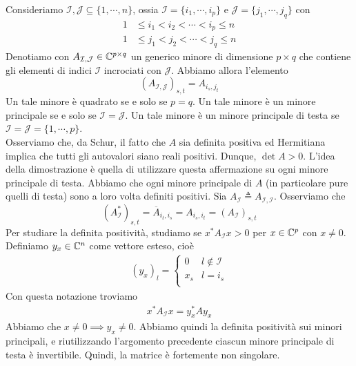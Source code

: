 \documentclass[a4paper]{article}
\begin{document}
\begin{snippetproof}{}
    Consideriamo \(\mathcal I, \mathcal J \subseteq \{1, \cdots, n\}\),
    ossia \(\mathcal I = \{i_1, \cdots, i_p\}\)
    e \(\mathcal J = \{j_1, \cdots, j_q\}\)
    con
    \begin{align*}
        1 &\leq i_1 < i_2 < \cdots < i_p \leq n \\
        1 &\leq j_1 < j_2 < \cdots < j_q \leq n
    \end{align*}
    Denotiamo con \(A_{\mathcal I, \mathcal J} \in \mathbb{C}^{p \times q}\)
    un generico minore di dimensione \(p \times q\) che contiene gli elementi di indici \(\mathcal I\) incrociati con \(\mathcal J\).
    Abbiamo allora l'elemento
    \[
        \left(A_{\mathcal I, \mathcal J}\right)_{s,t}
        = A_{i_s, j_t}
    \]
    Un tale minore è quadrato se e solo se \(p=q\).
    Un tale minore è un minore principale se e solo se \(\mathcal I = \mathcal J\).
    Un tale minore è un minore principale di testa se \(\mathcal I = \mathcal J = \{1, \cdots, p\}\). \\
    Osserviamo che, da Schur, il fatto che \(A\) sia definita positiva ed Hermitiana
    implica che tutti gli autovalori siano reali positivi.
    Dunque, \(\det A > 0\).
    L'idea della dimostrazione è quella di utilizzare questa affermazione su ogni minore principale di testa.
    Abbiamo che ogni minore principale di \(A\) (in particolare pure quelli di testa)
    sono a loro volta definiti positivi. Sia \(A_{\mathcal I} \triangleq A_{\mathcal I, \mathcal I}\).
    Osserviamo che \[
        \left(A_{\mathcal I}^*\right)_{s,t}
        = \overline{A}_{i_t, i_s}
        = A_{i_s, i_t}
        =\left(A_{\mathcal I}\right)_{s,t}
    \]
    Per studiare la definita positività, studiamo se \(x^* A_{\mathcal I} x > 0\)
    per \(x \in \mathbb{C}^p\) con \(x \neq 0\).
    Definiamo \(y_x \in \mathbb{C}^n\) come vettore esteso, cioè
    \begin{align*}
        (y_x)_l =
        \begin{cases}
            0 & l \notin \mathcal I \\
            x_s & l = i_s \\
        \end{cases}
    \end{align*}
    Con questa notazione troviamo
    \begin{align*}
        x^* A_{\mathcal I} x
        = y_x^* A y_x
    \end{align*}
    Abbiamo che \(x \neq 0 \implies y_x \neq 0\).
    Abbiamo quindi la definita positività sui minori principali, e riutilizzando l'argomento precedente
    ciascun minore principale di testa è invertibile. Quindi, la matrice è fortemente non singolare.
\end{snippetproof}
\end{document}
